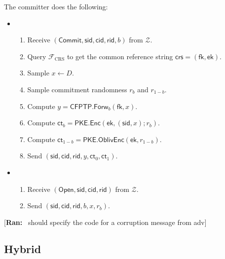 \documentclass[11pt,letterpaper]{article}
\newcommand{\authnote}[2]{[{\color{red}\textbf{#1:}}~{\color{blue} #2}]}
\newcommand{\authnote}[2]{}
\newcommand{\ran}[1]{\authnote{Ran}{#1}}
\theoremstyle{plain} %
\theoremstyle{definition} %
\theoremstyle{remark} %
\newcommand{\OpenMsg}{\mathsf{Open}}
\newcommand{\CommitMsg}{\mathsf{Commit}}
\newcommand{\Input}{x}
\newcommand{\PKE}{\mathsf{PKE}}
\newcommand{\Enc}{\mathsf{Enc}}
\newcommand{\OblivEnc}{\mathsf{OblivEnc}}
\newcommand{\EncKey}{\mathsf{ek}}
\newcommand{\Ct}{\mathsf{ct}}
\newcommand{\Rand}{r}
\newcommand{\CFPTP}{\mathsf{CFPTP}}
\newcommand{\Forw}{\mathsf{Forw}}
\newcommand{\ForwKey}{\mathsf{fk}}
\newcommand{\Domain}{D}
\newcommand{\Output}{y}
\newcommand{\Environment}{{\mathcal{Z}}} %
\newcommand{\IF}{\mathcal{F}} %
\newcommand{\sid}{\mathsf{sid}}
\newcommand{\CommitterId}{\mathsf{cid}}
\newcommand{\ReceiverId}{\mathsf{rid}}
\newcommand{\IFCrs}{\IF_{\mathrm{CRS}}}
\newcommand{\crs}{\mathsf{crs}}
\newcommand{\CommBit}{b}
\begin{document}
The committer does the following:
\begin{itemize}
\item {}
\begin{enumerate}[nolistsep]
	\item Receive $(\CommitMsg,\sid,\CommitterId,\ReceiverId,\CommBit)$ from $\Environment$.
	\item Query $\IFCrs$ to get the common reference string $\crs = (\ForwKey, \EncKey)$.
	\item Sample $\Input \gets \Domain$.
	\item Sample commitment randomness $\Rand_{\CommBit}$ and $\Rand_{1-\CommBit}$.
	\item Compute $\Output = \CFPTP.\Forw_{\CommBit}(\ForwKey,\Input)$.
	\item Compute $\Ct_{\CommBit} = \PKE.\Enc(\EncKey, (\sid,\Input); \Rand_\CommBit)$.
	\item Compute $\Ct_{1-\CommBit} = \PKE.\OblivEnc(\EncKey, \Rand_{1-\CommBit})$.
	\item Send $(\sid,\CommitterId,\ReceiverId,\Output, \Ct_0, \Ct_1)$.
\end{enumerate}

\item {}
\begin{enumerate}[nolistsep]
    \item Receive $(\OpenMsg,\sid,\CommitterId,\ReceiverId)$ from $\Environment$.
    \item Send $(\sid,\CommitterId,\ReceiverId,\CommBit, \Input, \Rand_{\CommBit})$.
\end{enumerate}
\end{itemize}
\ran{should specify the code for a corruption message from adv}
\subsection{Hybrid}
\label{sec:hyb-distr}
\end{document}
